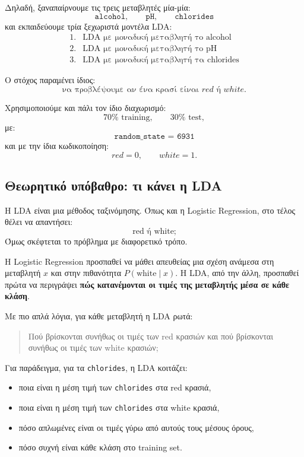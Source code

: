 \documentclass[11pt,a4paper]{article}
\newcommand{\code}[1]{\texttt{#1}}
\begin{document}
Δηλαδή, ξαναπαίρνουμε τις τρεις μεταβλητές μία-μία:
\[
\code{alcohol}, \qquad \code{pH}, \qquad \code{chlorides}
\]
και εκπαιδεύουμε τρία ξεχωριστά μοντέλα LDA:
\[
\begin{array}{ll}
1. & \text{LDA με μοναδική μεταβλητή το alcohol} \\
2. & \text{LDA με μοναδική μεταβλητή το pH} \\
3. & \text{LDA με μοναδική μεταβλητή τα chlorides}
\end{array}
\]

Ο στόχος παραμένει ίδιος:
\[
\text{να προβλέψουμε αν ένα κρασί είναι } red \text{ ή } white.
\]

Χρησιμοποιούμε και πάλι τον ίδιο διαχωρισμό:
\[
70\% \text{ training}, \qquad 30\% \text{ test},
\]
με:
\[
\code{random\_state = 6931}
\]
και με την ίδια κωδικοποίηση:
\[
red = 0, \qquad white = 1.
\]

\subsection{Θεωρητικό υπόβαθρο: τι κάνει η LDA}

Η LDA είναι μια μέθοδος ταξινόμησης. Όπως και η Logistic Regression, στο τέλος
θέλει να απαντήσει:
\[
\text{red ή white;}
\]
Όμως σκέφτεται το πρόβλημα με διαφορετικό τρόπο.

Η Logistic Regression προσπαθεί να μάθει απευθείας μια σχέση ανάμεσα στη
μεταβλητή \(x\) και στην πιθανότητα \(P(\text{white}\mid x)\). Η LDA, από την
άλλη, προσπαθεί πρώτα να περιγράψει \textbf{πώς κατανέμονται οι τιμές της
μεταβλητής μέσα σε κάθε κλάση}.

Με πιο απλά λόγια, για κάθε μεταβλητή η LDA ρωτά:
\begin{quote}
Πού βρίσκονται συνήθως οι τιμές των red κρασιών και πού βρίσκονται συνήθως οι
τιμές των white κρασιών;
\end{quote}

Για παράδειγμα, για τα \code{chlorides}, η LDA κοιτάζει:
\begin{itemize}
    \item ποια είναι η μέση τιμή των \code{chlorides} στα red κρασιά,
    \item ποια είναι η μέση τιμή των \code{chlorides} στα white κρασιά,
    \item πόσο απλωμένες είναι οι τιμές γύρω από αυτούς τους μέσους όρους,
    \item πόσο συχνή είναι κάθε κλάση στο training set.
\end{itemize}
\end{document}
